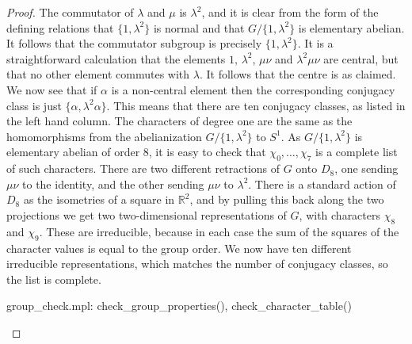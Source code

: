 \documentclass[reqno]{amsart}
\newcommand{\al}        {\alpha}
\newcommand{\lm}        {\lambda}
\newcommand{\R}         {{\mathbb{R}}}
\renewcommand{\:}{\colon}
\theoremstyle{definition}
\begin{document}
\begin{proof}
 The commutator of $\lm$ and $\mu$ is $\lm^2$, and it is clear from
 the form of the defining relations that $\{1,\lm^2\}$ is normal and
 that $G/\{1,\lm^2\}$ is elementary abelian.  It follows that the
 commutator subgroup is precisely $\{1,\lm^2\}$.  It is a
 straightforward calculation that the elements $1$, $\lm^2$, $\mu\nu$
 and $\lm^2\mu\nu$ are central, but that no other element commutes
 with $\lm$.  It follows that the centre is as claimed.  We now see
 that if $\al$ is a non-central element then the corresponding
 conjugacy class is just $\{\al,\lm^2\al\}$.  This means that there
 are ten conjugacy classes, as listed in the left hand column.  The
 characters of degree one are the same as the homomorphisms from the
 abelianization $G/\{1,\lm^2\}$ to $S^1$.  As $G/\{1,\lm^2\}$ is
 elementary abelian of order $8$, it is easy to check that
 $\chi_0,\dotsc,\chi_7$ is a complete list of such characters.  There
 are two different retractions of $G$ onto $D_8$, one sending $\mu\nu$
 to the identity, and the other sending $\mu\nu$ to $\lm^2$.  There is
 a standard action of $D_8$ as the isometries of a square in $\R^2$,
 and by pulling this back along the two projections we get two
 two-dimensional representations of $G$, with characters $\chi_8$ and
 $\chi_9$.  These are irreducible, because in each case the sum of the
 squares of the character values is equal to the group order.  We now
 have ten different irreducible representations, which matches the
 number of conjugacy classes, so the list is complete.
 \begin{checks}
  group_check.mpl: check_group_properties(), check_character_table()
 \end{checks}
\end{proof}
\end{document}
